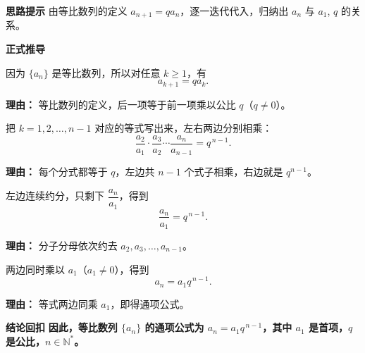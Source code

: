 \begin{proofbox}
	\textbf{\textcolor{CProof}{思路提示}}
	由等比数列的定义 $a_{n+1} = q a_n$，逐一迭代代入，归纳出 $a_n$ 与 $a_1$, $q$ 的关系。

	\medskip
	\textbf{\textcolor{CProof}{正式推导}}
	\begin{description}[style=nextline, leftmargin=2.8em, labelsep=0.5em, itemsep=0.55em]
		\item[\textbf{步骤一（定义列出）：}]
			因为 $\{a_n\}$ 是等比数列，所以对任意 $k\ge 1$，有
			\[
				a_{k+1} = q a_k .
			\]
			\par\textbf{理由：} 等比数列的定义，后一项等于前一项乘以公比 $q$（$q\neq 0$）。
		\item[\textbf{步骤二（连乘约简）：}]
			把 $k=1,2,\dots,n-1$ 对应的等式写出来，左右两边分别相乘：
			\[
				\frac{a_2}{a_1} \cdot \frac{a_3}{a_2} \cdots \frac{a_n}{a_{n-1}} = q^{\,n-1}.
			\]
			\par\textbf{理由：} 每个分式都等于 $q$，左边共 $n-1$ 个式子相乘，右边就是 $q^{n-1}$。
		\item[\textbf{步骤三（消去中间项）：}]
			左边连续约分，只剩下 $\dfrac{a_n}{a_1}$，得到
			\[
				\frac{a_n}{a_1} = q^{\,n-1}.
			\]
			\par\textbf{理由：} 分子分母依次约去 $a_2,a_3,\dots,a_{n-1}$。
		\item[\textbf{步骤四（整理得公式）：}]
			两边同时乘以 $a_1$（$a_1\neq 0$），得到
			\[
				a_n = a_1 q^{\,n-1}.
			\]
			\par\textbf{理由：} 等式两边同乘 $a_1$，即得通项公式。
	\end{description}

	\medskip
	\textbf{\textcolor{CProof}{结论回扣}}
	\textbf{因此，等比数列 $\{a_n\}$ 的通项公式为 $a_n = a_1 q^{\,n-1}$，其中 $a_1$ 是首项，$q$ 是公比，$n\in\mathbb{N}^*$。}
\end{proofbox}

